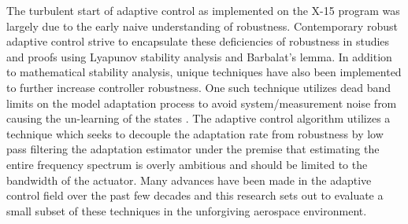 The turbulent start of adaptive control as implemented on the X-15 program was largely due to the early naive understanding of robustness.  Contemporary robust adaptive control strive to encapsulate these deficiencies of robustness in studies and proofs using Lyapunov stability analysis and Barbalat's lemma.  In addition to mathematical stability analysis, unique techniques have also been implemented to further increase controller robustness.  One such technique utilizes dead band limits on the model adaptation process to avoid system/measurement noise from causing the un-learning of the states \cite{lavretsky2013robust}.  The \Lone adaptive control algorithm utilizes a technique which seeks to decouple the adaptation rate from robustness by low pass filtering the adaptation estimator under the premise that estimating the entire frequency spectrum is overly ambitious and should be limited to the bandwidth of the actuator.  Many advances have been made in the adaptive control field over the past few decades and this research sets out to evaluate a small subset of these techniques in the unforgiving aerospace environment.





